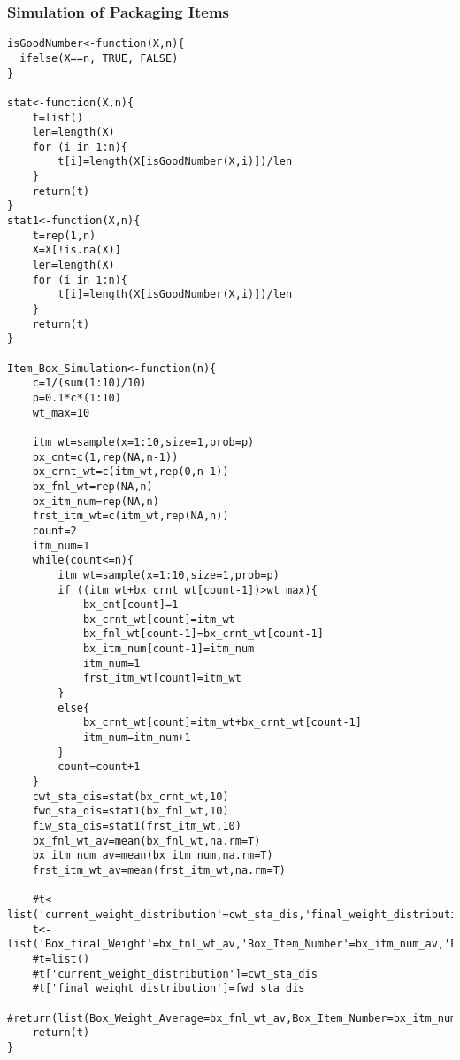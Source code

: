 \documentclass{article}
\begin{document}
\subsubsection{Simulation of Packaging Items}
\begin{lstlisting}
isGoodNumber<-function(X,n){
  ifelse(X==n, TRUE, FALSE)
}

stat<-function(X,n){
	t=list()
	len=length(X)
	for (i in 1:n){
		t[i]=length(X[isGoodNumber(X,i)])/len
	}
	return(t)
}
stat1<-function(X,n){
	t=rep(1,n)
	X=X[!is.na(X)]
	len=length(X)
	for (i in 1:n){
		t[i]=length(X[isGoodNumber(X,i)])/len
	}
	return(t)
}

Item_Box_Simulation<-function(n){ 
	c=1/(sum(1:10)/10)
	p=0.1*c*(1:10)
	wt_max=10

	itm_wt=sample(x=1:10,size=1,prob=p)
	bx_cnt=c(1,rep(NA,n-1))
	bx_crnt_wt=c(itm_wt,rep(0,n-1))
	bx_fnl_wt=rep(NA,n)
	bx_itm_num=rep(NA,n)
	frst_itm_wt=c(itm_wt,rep(NA,n))
	count=2
	itm_num=1
	while(count<=n){
		itm_wt=sample(x=1:10,size=1,prob=p)
		if ((itm_wt+bx_crnt_wt[count-1])>wt_max){
			bx_cnt[count]=1
			bx_crnt_wt[count]=itm_wt
			bx_fnl_wt[count-1]=bx_crnt_wt[count-1]
			bx_itm_num[count-1]=itm_num
			itm_num=1
			frst_itm_wt[count]=itm_wt
		}
		else{
			bx_crnt_wt[count]=itm_wt+bx_crnt_wt[count-1]
			itm_num=itm_num+1
		}
		count=count+1
	}
	cwt_sta_dis=stat(bx_crnt_wt,10)
	fwd_sta_dis=stat1(bx_fnl_wt,10)
	fiw_sta_dis=stat1(frst_itm_wt,10)
	bx_fnl_wt_av=mean(bx_fnl_wt,na.rm=T)
	bx_itm_num_av=mean(bx_itm_num,na.rm=T)
	frst_itm_wt_av=mean(frst_itm_wt,na.rm=T)

	#t<-list('current_weight_distribution'=cwt_sta_dis,'final_weight_distribution'=fwd_sta_dis,'First_Item_Weight'=fiw_sta_dis)
	t<-list('Box_final_Weight'=bx_fnl_wt_av,'Box_Item_Number'=bx_itm_num_av,'First_Item_Weight_Probobaility'=fiw_sta_dis)
	#t=list()
	#t['current_weight_distribution']=cwt_sta_dis
	#t['final_weight_distribution']=fwd_sta_dis
	#return(list(Box_Weight_Average=bx_fnl_wt_av,Box_Item_Number=bx_itm_num_av,First_Item_Weight=frst_itm_wt_av))
	return(t)
}
\end{lstlisting}
\end{document}
